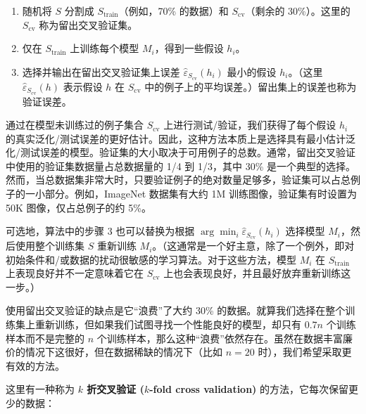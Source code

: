 \begin{enumerate}
    \item 随机将 $S$ 分割成 $S_{\text{train}}$（例如，70\% 的数据）和 $S_{\text{cv}}$（剩余的 30\%）。这里的 $S_{\text{cv}}$ 称为留出交叉验证集。
    \item 仅在 $S_{\text{train}}$ 上训练每个模型 $M_i$，得到一些假设 $h_i$。
    \item 选择并输出在留出交叉验证集上误差 $\hat{\varepsilon}_{S_{\text{cv}}}(h_i)$ 最小的假设 $h_i$。（这里 $\hat{\varepsilon}_{S_{\text{cv}}}(h)$ 表示假设 $h$ 在 $S_{\text{cv}}$ 中的例子上的平均误差。）留出集上的误差也称为验证误差。
\end{enumerate}

通过在模型未训练过的例子集合 $S_{\text{cv}}$ 上进行测试/验证，我们获得了每个假设 $h_i$ 的真实泛化/测试误差的更好估计。因此，这种方法本质上是选择具有最小估计泛化/测试误差的模型。验证集的大小取决于可用例子的总数。通常，留出交叉验证中使用的验证集数据量占总数据量的 1/4 到 1/3，其中 30\% 是一个典型的选择。然而，当总数据集非常大时，只要验证例子的绝对数量足够多，验证集可以占总例子的一小部分。例如，ImageNet 数据集有大约 1M 训练图像，验证集有时设置为 50K 图像，仅占总例子的约 5\%。

可选地，算法中的步骤 3 也可以替换为根据 $\arg \min_i \hat{\varepsilon}_{S_{\text{cv}}}(h_i)$ 选择模型 $M_i$，然后使用整个训练集 $S$ 重新训练 $M_i$。（这通常是一个好主意，除了一个例外，即对初始条件和/或数据的扰动很敏感的学习算法。对于这些方法，模型 $M_i$ 在 $S_{\text{train}}$ 上表现良好并不一定意味着它在 $S_{\text{cv}}$ 上也会表现良好，并且最好放弃重新训练这一步。）

使用留出交叉验证的缺点是它“浪费”了大约 30\% 的数据。就算我们选择在整个训练集上重新训练，但如果我们试图寻找一个性能良好的模型，却只有 $0.7n$ 个训练样本而不是完整的 $n$ 个训练样本，那么这种“浪费”依然存在。虽然在数据丰富廉价的情况下这很好，但在数据稀缺的情况下（比如 $n=20$ 时），我们希望采取更有效的方法。

这里有一种称为 \textbf{$k$ 折交叉验证 ($k$-fold cross validation)} 的方法，它每次保留更少的数据：

